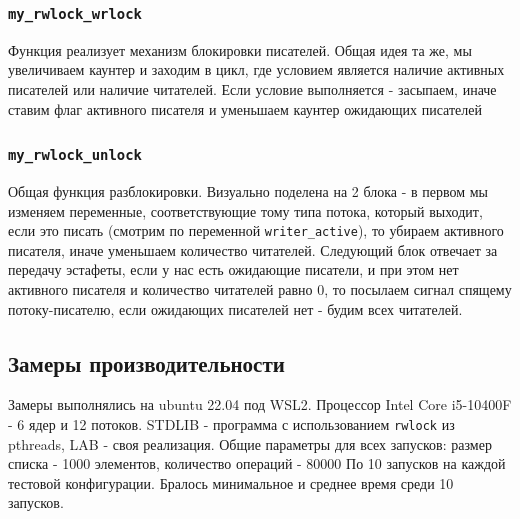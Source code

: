 \documentclass[12pt,a4paper]{article}
\begin{document}
\subsubsection{\texttt{my\_rwlock\_wrlock}}
Функция реализует механизм блокировки писателей. Общая идея та же, мы увеличиваем каунтер и заходим в цикл, 
где условием является наличие активных писателей или наличие читателей. Если условие выполняется - засыпаем, иначе 
ставим флаг активного писателя и уменьшаем каунтер ожидающих писателей

\subsubsection{\texttt{my\_rwlock\_unlock}}
Общая функция разблокировки. Визуально поделена на 2 блока - в первом мы изменяем переменные, соответствующие
тому типа потока, который выходит, если это писать (смотрим по переменной \texttt{writer\_active}), то 
убираем активного писателя, иначе уменьшаем количество читателей. Следующий блок отвечает за передачу эстафеты, 
если у нас есть ожидающие писатели, и при этом нет активного писателя и количество читателей равно 0, то посылаем
сигнал спящему потоку-писателю, если ожидающих писателей нет - будим всех читателей.


\subsection{Замеры производительности}

Замеры выполнялись на ubuntu 22.04 под WSL2. Процессор Intel Core i5-10400F - 6 ядер и 12 потоков.
STDLIB - программа с использованием \texttt{rwlock} из pthreads, LAB - своя реализация.
Общие параметры для всех запусков: размер списка - 1000 элементов, количество операций - 80000
По 10 запусков на каждой тестовой конфигурации. Бралось минимальное и среднее время среди 10 запусков.
\end{document}
